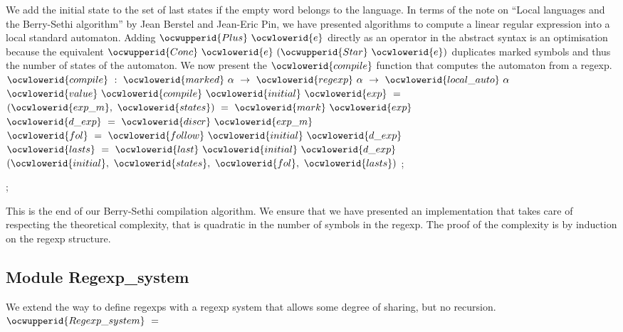 \documentclass[12pt]{article}
\begin{document}
\ocwendcode{}\ocwindent{0.00em}
We add the initial state to the set of last states if the empty word belongs to the language. 
\ocweol
\ocwindent{0.00em}
In terms of the note on ``Local languages and the Berry-Sethi algorithm'' 
   by Jean Berstel and Jean-Eric Pin, we have presented algorithms to compute
   a linear regular expression into a local standard automaton. Adding 
   \ocwbegindcode{}$\ocwupperid{Plus}~\ocwlowerid{e}$\ocwenddcode{} directly as an operator in the abstract syntax is an optimisation 
   because the equivalent \ocwbegindcode{}$\ocwupperid{Conc}~\ocwlowerid{e}~(\ocwupperid{Star}~\ocwlowerid{e})$\ocwenddcode{} duplicates marked symbols
   and thus the number of states of the automaton. 
\ocweol
\ocwindent{0.00em}
We now present the \ocwbegindcode{}$\ocwlowerid{compile}$\ocwenddcode{} function that computes the automaton 
   from a regexp. 
\ocweol
\ocwindent{0.00em}
\ocwbegindcode{}$\ocwlowerid{compile}~:~\ocwlowerid{marked}~\alpha{}~\rightarrow{}~\ocwlowerid{regexp}~\alpha{}~\rightarrow{}~\ocwlowerid{local\_auto}~\alpha{}$\ocwenddcode{} 
\ocweol
\label{../ML/regular.ml:12280}%
\medskip
\ocwbegincode{}\ocwindent{0.00em}
$\ocwlowerid{value}~\ocwlowerid{compile}~\ocwlowerid{initial}~\ocwlowerid{exp}~=~$\ocweol
\ocwindent{1.00em}
~$(\ocwlowerid{exp\_m},~\ocwlowerid{states})~=~\ocwlowerid{mark}~\ocwlowerid{exp}~$~\ocweol
\ocwindent{1.00em}
~$\ocwlowerid{d\_exp}~=~\ocwlowerid{discr}~\ocwlowerid{exp\_m}~$\ocweol
\ocwindent{1.00em}
~$\ocwlowerid{fol}~=~\ocwlowerid{follow}~\ocwlowerid{initial}~\ocwlowerid{d\_exp}~$\ocweol
\ocwindent{1.00em}
~$\ocwlowerid{lasts}~=~\ocwlowerid{last}~\ocwlowerid{initial}~\ocwlowerid{d\_exp}~$\ocweol
\ocwindent{1.00em}
$(\ocwlowerid{initial},~\ocwlowerid{states},~\ocwlowerid{fol},~\ocwlowerid{lasts})$\ocweol
\ocwindent{0.00em}
;\medskip

\label{../ML/regular.ml:12480}%
\ocwindent{0.00em}
;\medskip

\ocwendcode{}\ocwindent{0.00em}
This is the end of our Berry-Sethi compilation algorithm. We ensure
   that we have presented an implementation that takes care of
   respecting the theoretical complexity, that is quadratic in
   the number of symbols in the regexp. The proof of the complexity
   is by induction on the regexp structure. 
\ocweol
\ocwindent{0.00em}
\subsection{Module Regexp\_system} 
\ocweol
\ocwindent{0.00em}
We extend the way to define regexps with a regexp system that allows 
   some degree of sharing, but no recursion. 
\ocweol
\label{../ML/regular.ml:12963}%
\medskip
\ocwbegincode{}\ocwindent{0.00em}
~$\ocwupperid{Regexp\_system}~=~$\medskip
\end{document}
